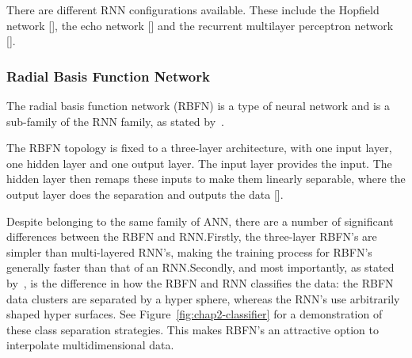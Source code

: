 There are different RNN configurations available. These include the Hopfield network [\cite{hopfield1982neural}], the echo network [\cite{jaeger2001echo}] and the recurrent multilayer perceptron network [\cite{tutschku1995recurrent}].

\subsubsection{Radial Basis Function Network}

The radial basis function network (RBFN) is a type of neural network and is a sub-family of the RNN family, as stated by~\cite{wilamowski1996implementation}. 

The RBFN topology is fixed to a three-layer architecture, with one input layer, one hidden layer and one output layer. The input layer provides the input. The hidden layer then remaps these inputs to make them linearly separable, where the output layer does the separation and outputs the data [\cite{xie2011comparison}].  

Despite belonging to the same family of ANN, there are a number of significant differences between the RBFN and RNN.\@ Firstly, the three-layer RBFN's are simpler than multi-layered RNN's, making the training process for RBFN's generally faster than that of an RNN.\@ Secondly, and most importantly, as stated by~\citeauthor{xie2011comparison}, is the difference in how the RBFN and RNN classifies the data: the RBFN data clusters are separated by a hyper sphere, whereas the RNN's use arbitrarily shaped hyper surfaces. See Figure~\ref{fig:chap2-classifier} for a demonstration of these class separation strategies. This makes RBFN's an attractive option to interpolate multidimensional data.

